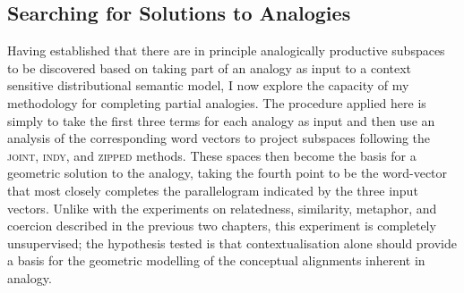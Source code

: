 \subsection{Searching for Solutions to Analogies} \label{sec:solutions}
Having established that there are in principle analogically productive subspaces to be discovered based on taking part of an analogy as input to a context sensitive distributional semantic model, I now explore the capacity of my methodology for completing partial analogies.  The procedure applied here is simply to take the first three terms for each analogy as input and then use an analysis of the corresponding word vectors to project subspaces following the \textsc{joint}, \textsc{indy}, and \textsc{zipped} methods.    These spaces then become the basis for a geometric solution to the analogy, taking the fourth point to be the word-vector that most closely completes the parallelogram indicated by the three input vectors.  Unlike with the experiments on relatedness, similarity, metaphor, and coercion described in the previous two chapters, this experiment is completely unsupervised; the hypothesis tested is that contextualisation alone should provide a basis for the geometric modelling of the conceptual alignments inherent in analogy.

